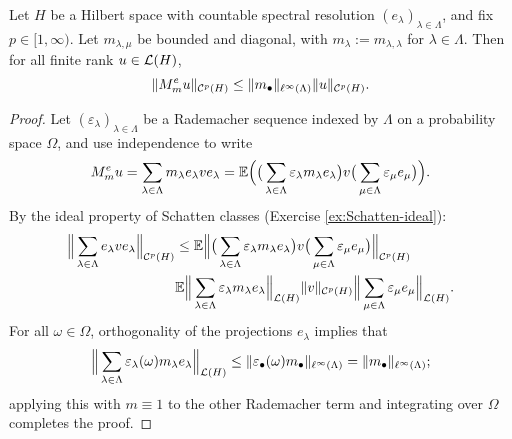 \begin{lem}\label{lem:schur-diag}
  Let $H$ be a Hilbert space with countable spectral resolution $(e_{\lambda})_{\lambda \in \Lambda}$, and fix $p \in [1,\infty)$.
  Let $m_{\lambda,\mu}$ be bounded and diagonal, with $m_{\lambda} := m_{\lambda,\lambda}$ for $\lambda \in \Lambda$.
  Then for all finite rank $u \in \mathcal{L}(H)$,
  \begin{equation*}
    \|M_{m}^{e} u\|_{\mathcal{C}^{p}(H)} \leq \|m_{\bullet}\|_{\ell^\infty(\Lambda)} \|u\|_{\mathcal{C}^{p}(H)}.
  \end{equation*}
\end{lem}

\begin{proof}
  Let $(\varepsilon_{\lambda})_{\lambda \in \Lambda}$ be a Rademacher sequence indexed by $\Lambda$ on a probability space $\Omega$, and use independence to write
  \begin{equation*}
    M_{m}^{e} u = \sum_{\lambda \in \Lambda} m_{\lambda} e_{\lambda} v e_{\lambda} = \mathbb{E} \Big( \big(\sum_{\lambda \in \Lambda} \varepsilon_{\lambda} m_{\lambda} e_{\lambda} \big) v \big(\sum_{\mu \in \Lambda} \varepsilon_{\mu} e_{\mu} \big) \Big).
  \end{equation*}
  By the ideal property of Schatten classes (Exercise \ref{ex:Schatten-ideal}):
  \begin{equation*}
    \begin{aligned}
    \Big\| \sum_{\lambda \in \Lambda} e_{\lambda} v e_{\lambda} \Big\|_{\mathcal{C}^{p}(H)}
    &\leq \mathbb{E} \Big\| \big(\sum_{\lambda \in \Lambda} \varepsilon_{\lambda} m_{\lambda} e_{\lambda} \big) v \big(\sum_{\mu \in \Lambda} \varepsilon_{\mu} e_{\mu} \big) \Big\|_{\mathcal{C}^{p}(H)} \\
    &\mathbb{E} \Big\| \sum_{\lambda \in \Lambda} \varepsilon_{\lambda} m_{\lambda} e_{\lambda} \Big\|_{\mathcal{L}(H)} \|v\|_{\mathcal{C}^{p}(H)} \Big\| \sum_{\mu \in \Lambda} \varepsilon_{\mu} e_{\mu} \Big\|_{\mathcal{L}(H)}.
  \end{aligned}
\end{equation*}
For all $\omega \in \Omega$, orthogonality of the projections $e_{\lambda}$ implies that
\begin{equation*}
  \Big\| \sum_{\lambda \in \Lambda} \varepsilon_{\lambda}(\omega) m_{\lambda} e_{\lambda} \Big\|_{\mathcal{L}(H)} \leq \|\varepsilon_{\bullet} (\omega) m_{\bullet}\|_{\ell^\infty(\Lambda)} = \| m_{\bullet}\|_{\ell^\infty(\Lambda)};
\end{equation*}
applying this with $m \equiv 1$ to the other Rademacher term and integrating over $\Omega$ completes the proof.
\end{proof}

